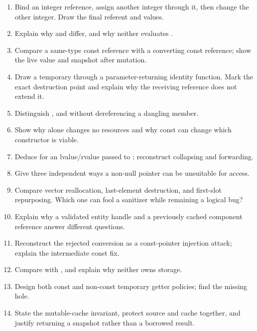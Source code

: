 \begin{enumerate}
\def\labelenumi{\arabic{enumi}.}
\tightlist
\item
  Bind an integer reference, assign another integer through it, then change the other integer. Draw the final referent and values.
\item
  Explain why  and  differ, and why neither evaluates .
\item
  Compare a same-type const reference with a converting const reference; show the live value and snapshot after mutation.
\item
  Draw a temporary through a parameter-returning identity function. Mark the exact destruction point and explain why the receiving reference does not extend it.
\item
  Distinguish ,  and  without dereferencing a dangling member.
\item
  Show why  alone changes no resources and why const can change which constructor is viable.
\item
  Deduce  for an lvalue/rvalue passed to ; reconstruct collapsing and forwarding.
\item
  Give three independent ways a non-null pointer can be unsuitable for access.
\item
  Compare vector reallocation, last-element destruction, and first-slot repurposing. Which one can fool a sanitizer while remaining a logical bug?
\item
  Explain why a validated entity handle and a previously cached component reference answer different questions.
\item
  Reconstruct the rejected  conversion as a const-pointer injection attack; explain the intermediate const fix.
\item
  Compare  with , and explain why neither owns storage.
\item
  Design both const and non-const temporary getter policies; find the missing  hole.
\item
  State the mutable-cache invariant, protect source and cache together, and justify returning a snapshot rather than a borrowed result.
\end{enumerate}

